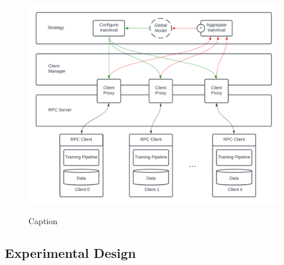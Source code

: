 \documentclass[letterpaper]{article} %
\begin{document}
\begin{figure}[h]
{\includegraphics[width=\columnwidth]{High Level Architecture(1)}}
\caption{Caption}
\end{figure}

\subsection{Experimental Design}
\end{document}
